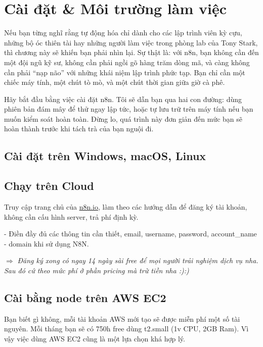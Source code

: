 \chapter{Cài đặt \& Môi trường làm việc}


Nếu bạn từng nghĩ rằng tự động hóa chỉ dành cho các lập trình viên kỳ cựu, những bộ óc thiên tài hay những người làm việc trong phòng lab của Tony Stark, thì chương này sẽ khiến bạn phải nhìn lại. Sự thật là: với n8n, bạn không cần đến một đội ngũ kỹ sư, không cần phải ngồi gõ hàng trăm dòng mã, và càng không cần phải “nạp não” với những khái niệm lập trình phức tạp. Bạn chỉ cần một chiếc máy tính, một chút tò mò, và một chút thời gian giữa giờ cà phê.

Hãy bắt đầu bằng việc cài đặt n8n. Tôi sẽ dẫn bạn qua hai con đường: dùng phiên bản đám mây để thử ngay lập tức, hoặc tự lưu trữ trên máy tính nếu bạn muốn kiểm soát hoàn toàn. Đừng lo, quá trình này đơn giản đến mức bạn sẽ hoàn thành trước khi tách trà của bạn nguội đi.


\section{Cài đặt trên Windows, macOS, Linux}

\section{Chạy trên Cloud}
Truy cập trang chủ của \href{n8n.io}{n8n.io}, làm theo các hướng dẫn để đăng ký tài khoản, không cần cấu hình server, trả phí định kỳ.

- Điền đầy đủ các thông tin cần thiết, email, username, password, account\_name - domain khi sử dụng N8N. 

$\Rightarrow$ \textit{Đăng ký xong có ngay 14 ngày sài free để mọi người trải nghiệm dịch vụ nha. Sau đó cứ theo mức phí ở phần pricing mà trừ tiền nha :):)}

\section{Cài bằng node trên AWS EC2}

Bạn biết gì không, mỗi tài khoản AWS mới tạo sẽ được miễn phí một số tài nguyên. Mỗi tháng bạn sẽ có 750h free dùng t2.small (1v CPU, 2GB Ram). Vì vậy việc dùng AWS EC2 cũng là một lựa chọn khá hợp lý.

